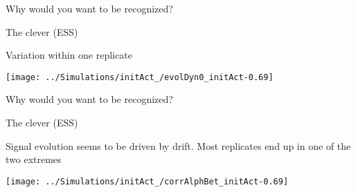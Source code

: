 \documentclass[
  ignorenonframetext,
]{beamer}
\begin{document}
\begin{frame}{Why would you want to be recognized?}
\protect\hypertarget{why-would-you-want-to-be-recognized-9}{}

\begin{block}{The clever (ESS)}

Variation within one replicate

\begin{flushleft}\texttt{[image: ../Simulations/initAct\_/evolDyn0\_initAct-0.69]} \end{flushleft}

\end{block}

\end{frame}

\begin{frame}{Why would you want to be recognized?}
\protect\hypertarget{why-would-you-want-to-be-recognized-10}{}

\begin{block}{The clever (ESS)}

Signal evolution seems to be driven by drift. Most replicates end up in
one of the two extremes

\begin{flushleft}\texttt{[image: ../Simulations/initAct\_/corrAlphBet\_initAct-0.69]} \end{flushleft}

\end{block}

\end{frame}
\end{document}
